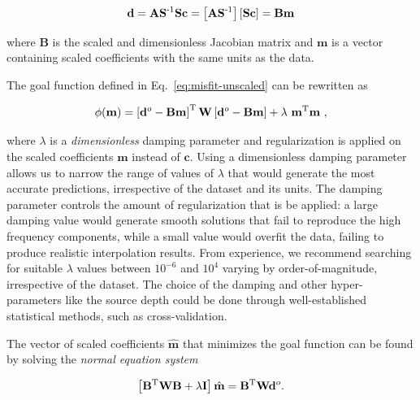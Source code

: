 \begin{equation}
    \mathbf{d}
    =
    \mathbf{A} \mathbf{S}^{\text{-}1} \mathbf{S} \mathbf{c}
    =
    \left[
        \mathbf{A} \mathbf{S}^{\text{-}1}
    \right]
    \left[
        \mathbf{S} \mathbf{c}
    \right]
    =
    \mathbf{B} \mathbf{m}
\end{equation}

\noindent where $\mathbf{B}$ is the scaled and dimensionless Jacobian matrix
and $\mathbf{m}$ is a vector containing scaled coefficients with the same units
as the data.

The goal function defined in Eq.~\ref{eq:misfit-unscaled} can be
rewritten as

\begin{equation}
    \phi(\mathbf{m}) =
    \left[\mathbf{d}^o - \mathbf{B}\mathbf{m}\right]^{\text{T}}
    \mathbf{W}
    \left[\mathbf{d}^o - \mathbf{B}\mathbf{m}\right]
    + \lambda\ \mathbf{m}^{\text{T}}\mathbf{m}
    \ ,
    \label{eq:misfit}
\end{equation}

\noindent where $\lambda$ is a \emph{dimensionless} damping parameter and
regularization is applied on the scaled coefficients $\mathbf{m}$ instead of
$\mathbf{c}$.
Using a dimensionless damping parameter allows us to narrow the range of values
of $\lambda$ that would generate the most accurate predictions, irrespective
of the dataset and its units.
The damping parameter controls the amount of regularization that is be applied:
a large damping value would generate smooth solutions that fail to reproduce
the high frequency components, while a small value would overfit the data,
failing to produce realistic interpolation results.
From experience, we recommend searching for suitable $\lambda$ values between
$10^{-6}$ and $10^{4}$ varying by order-of-magnitude, irrespective of the
dataset.
The choice of the damping and other hyper-parameters like the source depth could be done through
well-established statistical methods, such as cross-validation.

The vector of scaled coefficients $\hat{\mathbf{m}}$ that minimizes the goal
function can be found by solving the \emph{normal equation system}
\citep{menke1989}

\begin{equation}
    \left[
      \mathbf{B}^{\text{T}} \mathbf{W} \mathbf{B} + \lambda \mathbf{I}
    \right]
    \hat{\mathbf{m}} =
    \mathbf{B}^{\text{T}}\mathbf{W}
    \mathbf{d}^o.
    \label{eq:least_squares_solution}
\end{equation}

